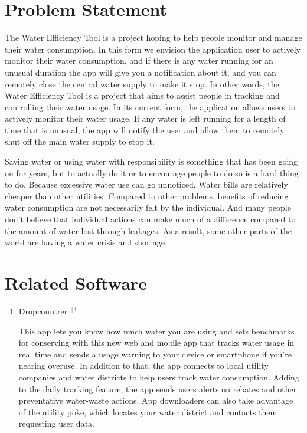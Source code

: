 \documentclass[10pt]{article}
\begin{document}
\begin{multicols*}{2}
\section{Problem Statement}
The Water Efficiency Tool is a project hoping to help people monitor and manage their water consumption. In this form we envision the application user to actively monitor their water consumption, and if there is any water running for an unusual duration the app will give you a notification about it, and you can remotely close the central water supply to make it stop. In other words, the Water Efficiency Tool is a project that aims to assist people in tracking and controlling their water usage. In its current form, the application allows users to actively monitor their water usage. If any water is left running for a length of time that is unusual, the app will notify the user and allow them to remotely shut off the main water supply to stop it.

Saving water or using water with responsibility is something that has been going on for years, but to actually do it or to encourage people to do so is a hard thing to do. Because excessive water use can go unnoticed. Water bills are relatively cheaper than other utilities. Compared to other problems, benefits of reducing water consumption are not necessarily felt by the individual. And many people don't believe that individual actions can make much of a difference compared to the amount of water lost through leakages. As a result, some other parts of the world are having a water crisis and shortage.

\clearpage

\section{Related Software}

\begin{enumerate}

  \item {Dropcountrer ${ }^{[1]}$}
  
  This app lets you know how much water you are using and sets benchmarks for conserving with this new web and mobile app that tracks water usage in real time and sends a usage warning to your device or smartphone if you're nearing overuse. In addition to that, the app connects to local utility companies and water districts to help users track water consumption. Adding to the daily tracking feature, the app sends users alerts on rebates and other preventative water-waste actions. App downloaders can also take advantage of the utility poke, which locates your water district and contacts them requesting user data.


\end{enumerate}
\end{multicols*}
\end{document}
